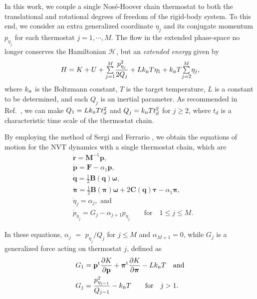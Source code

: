 \documentclass[
	aip,
	jcp,
	reprint,
]{revtex4-1}
\newcommand{\mt}[1]{\boldsymbol{\mathbf{#1}}}          %
\newcommand{\vt}[1]{\boldsymbol{\mathbf{#1}}}          %
\newcommand{\tr}[1]{#1^\text{t}}                       %
\newcommand{\diff}[2]{\frac{\partial #1}{\partial #2}} %
\newcommand{\Ham}[1]{{\mathcal H}_\text{#1}}           %
\begin{document}
In this work, we couple a single Nos\'{e}-Hoover chain thermostat \cite{Martyna_1992} to both the translational and rotational degrees of freedom of the rigid-body system.
To this end, we consider an extra generalized coordinate $\eta_j$ and its conjugate momentum $p_{\eta_j}$ for each thermostat $j = 1, \cdots, M$.
The flow in the extended phase-space no longer conserves the Hamiltonian $\Ham{}$, but an \textit{extended energy} given by \cite{Martyna_1992}
\begin{equation}
\label{eq:nvt extended energy}
H = K + U + {\textstyle\sum\limits_{j=1}^{M}} \frac{p_{\eta_j}^2}{2Q_j} + L k_\text{\tiny B} T\eta_1 + k_\text{\tiny B} T {\textstyle\sum\limits_{j=2}^{M}} \eta_j,
\end{equation}
where $k_\text{\tiny B}$ is the Boltzmann constant, $T$ is the target temperature, $L$ is a constant to be determined, and each $Q_j$ is an inertial parameter.
As recommended in Ref.~, we can make $Q_1 = L k_\text{\tiny B} T t_d^2$ and $Q_j = k_\text{\tiny B} T t_d^2$ for $j \geq 2$, where $t_d$ is a characteristic time scale of the thermostat chain.

By employing the method of Sergi and Ferrario \cite{Sergi_2001}, we obtain the equations of motion for the NVT dynamics with a single thermostat chain, which are
\begin{subequations}
	\label{eq:ODE system for NVT}
	\begin{align}
\label{eq:nhc_r}
	&\dot{\vt r} =
	{\mt M}^{-1} {\vt p}, \\
%
\label{eq:nhc_p} 
	&\dot{\vt p} =
	{\vt F} - \alpha_1 {\vt p},\\
%
\label{eq:nhc_q}
	&\dot{\vt q} =
	\frac{1}{2} \mt B(\vt q) \vt \omega, \\
%
\label{eq:nhc_pi}
	&\dot{\vt \pi} =
	\frac{1}{2} \mt B(\vt \pi) \vt \omega + 2 \mt C(\vt q) \vt \tau - \alpha_1 {\vt \pi}, \\
%
\label{eq:nhc_eta}
	&\dot{\eta}_j = \alpha_j, \text{ and} \\
%
\label{eq:nhc_p_eta}
	&{\dot p}_{\eta_j} = G_j - \alpha_{j+1} p_{\eta_j} \qquad \text{for} \quad 1 \leq j \le M.
	\end{align}
\end{subequations}

In these equations, $\alpha_j$ $=$ ${p_{\eta_j}}/{Q_j}$ for $j \le M$ and $\alpha_{M+1} = 0$, while $G_j$ is a generalized force acting on thermostat $j$, defined as
\begin{subequations}
\begin{align}
\label{eq:generalized force NVT}
&G_1 = \tr{\vt p} \diff{K}{\vt p} + \tr{\vt \pi} \diff{K}{\vt \pi} - L k_\text{\tiny B} T \quad \text{and}\\
&G_j = \frac{p_{\eta_{j-1}}^2}{Q_{j-1}} - k_\text{\tiny B} T  \qquad \text{for} \quad j > 1.
\end{align}
\end{subequations}
\end{document}
